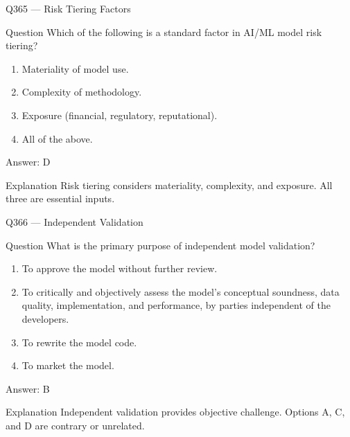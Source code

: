 \documentclass[aspectratio=169,8pt]{beamer}
\begin{document}
	\begin{frame}{Q365 --- Risk Tiering Factors}
		\begin{block}{Question}
			Which of the following is a standard factor in AI/ML model risk tiering?
			\begin{enumerate}
				\item Materiality of model use.
				\item Complexity of methodology.
				\item Exposure (financial, regulatory, reputational).
				\item All of the above.
			\end{enumerate}
		\end{block}
		\begin{exampleblock}{Answer: D}\end{exampleblock}
		\begin{block}{Explanation}
			Risk tiering considers materiality, complexity, and exposure. All three are essential inputs.
		\end{block}
	\end{frame}
	
	\begin{frame}{Q366 --- Independent Validation}
		\begin{block}{Question}
			What is the primary purpose of independent model validation?
			\begin{enumerate}
				\item To approve the model without further review.
				\item To critically and objectively assess the model's conceptual soundness, data quality, implementation, and performance, by parties independent of the developers.
				\item To rewrite the model code.
				\item To market the model.
			\end{enumerate}
		\end{block}
		\begin{exampleblock}{Answer: B}\end{exampleblock}
		\begin{block}{Explanation}
			Independent validation provides objective challenge. Options A, C, and D are contrary or unrelated.
		\end{block}
	\end{frame}
	
\end{document}
